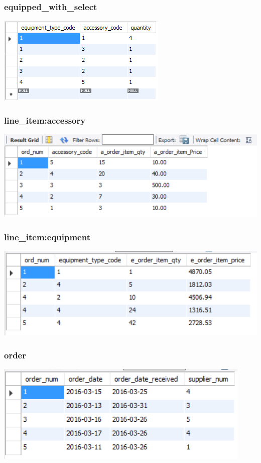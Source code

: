 \documentclass[12pt]{article}
\begin{document}
\subsubsection*{equipped\_with\_select} \includegraphics[scale=0.65]{screenshots/tables/equipped_with_select.PNG} \\
\subsubsection*{line\_item:accessory} \includegraphics[scale=0.65]{screenshots/tables/line_item_accessory_snip.PNG} \\
\subsubsection*{line\_item:equipment} \includegraphics[scale=0.65]{screenshots/tables/line_item_equipment_snip.PNG} \\
\subsubsection*{order} \includegraphics[scale=0.65]{screenshots/tables/order_snip.PNG} \\
\end{document}
